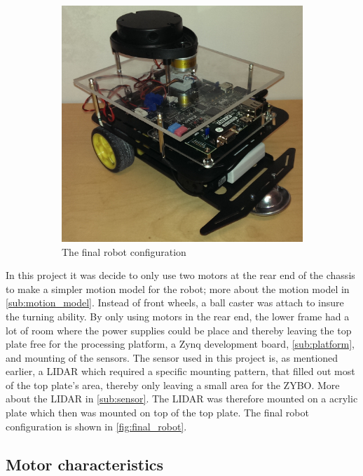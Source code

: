 \documentclass[Main]{subfiles}
\begin{document}
\begin{figure}[H]
\begin{subfigure}[b]{0.4\linewidth}
				\includegraphics[width=1\linewidth]{./Figures/final_robot.png}
				\caption{The final robot configuration}
				\label{fig:final_robot}
			\end{subfigure}
		\caption{}
		\label{fig:robots}
		\end{figure}
		In this project it was decide to only use two motors at the rear end of the chassis to make a simpler motion model for the robot; more about the motion model in \autoref{sub:motion_model}. 
		Instead of front wheels, a ball caster was attach to insure the turning ability. 
		By only using motors in the rear end, the lower frame had a lot of room where the power supplies could be place and thereby leaving the top plate free for the processing platform, a Zynq development board, \autoref{sub:platform}, and mounting of the sensors. 
		The sensor used in this project is, as mentioned earlier, a LIDAR which required a specific mounting pattern, that filled out most of the top plate's area, thereby only leaving a small area for the ZYBO. 
		More about the LIDAR in \autoref{sub:sensor}.
		The LIDAR was therefore mounted on a acrylic plate which then was mounted on top of the top plate. 
		The final robot configuration is shown in \autoref{fig:final_robot}.
		

	\subsection{Motor characteristics} %
	\label{sub:motor_characteristics}
\end{document}
